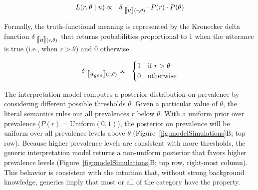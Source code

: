 \documentclass[floatsintext,man]{apa6}
\theoremstyle{definition}
\theoremstyle{definition}
\theoremstyle{definition}
\theoremstyle{remark}
\begin{document}
\begin{eqnarray}
L(r, \theta \mid u) &\propto& {\delta_{\mbox{ $[\![ u ]\!]$}(r, \theta)} \cdot P(r) \cdot P(\theta)} \label{eq:L0}
\end{eqnarray}

Formally, the truth-functional meaning is represented by the Kronecker
delta function \(\delta_{\mbox{ $[\![ u ]\!]$}(r, \theta)}\) that returns
probabilities proportional to \(1\) when the utterance is true (i.e.,
when \(r > \theta\)) and \(0\) otherwise.

\begin{eqnarray}
\delta_{\mbox{ $[\![ u_{gen} ]\!]$}(r, \theta)} &\propto  & \begin{cases}
1 & \text{if } r > \theta \\
0 & \text{otherwise}
\end{cases}\label{eq:delta}
\end{eqnarray}

The interpretation model computes a posterior distribution on prevalence
by considering different possible thresholds \(\theta\). Given a
particular value of \(\theta\), the literal semantics rules out all
prevalences \(r\) below \(\theta\). With a uniform prior over prevalence
(\(P(r) = \text{Uniform}(0, 1)\)), the posterior on prevalence will be
uniform over all prevalence levels above \(\theta\)
(Figure~\ref{fig:modelSimulations}B; top row). Because higher prevalence
levels are consistent with more thresholds, the generic interpretation
model returns a non-uniform posterior that favors higher prevalence
levels (Figure~\ref{fig:modelSimulations}B; top row, right-most column).
This behavior is consistent with the intuition that, without strong
background knowledge, generics imply that most or all of the category
have the property.
\end{document}
